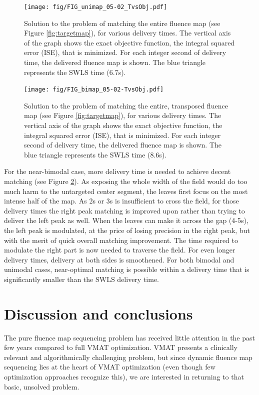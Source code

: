 \documentclass{iopart}
\begin{document}
\begin{figure}
  \centering
  \texttt{[image: fig/FIG\_unimap\_05-02\_TvsObj.pdf]}
  \caption{Solution to the problem of matching the entire fluence map (see Figure \ref{fig:targetmap}), for various delivery times. The vertical axis of the graph shows the exact objective function, the integral squared error (ISE), that is minimized. For each integer second of delivery time, the delivered fluence map is shown. The blue triangle represents the SWLS time (6.7s).}
  \label{fig:TvsObj_bestalpha_uni}
\end{figure}

\begin{figure}
  \centering
  \texttt{[image: fig/FIG\_bimap\_05-02-TvsObj.pdf]}
  \caption{Solution to the problem of matching the entire, transposed fluence map (see Figure \ref{fig:targetmap}), for various delivery times. The vertical axis of the graph shows the exact objective function, the integral squared error (ISE), that is minimized. For each integer second of delivery time, the delivered fluence map is shown. The blue triangle represents the SWLS time (8.6s).}
  \label{fig:TvsObj_bestalpha_bi}
\end{figure}

For the near-bimodal case, more delivery time is needed to achieve decent matching (see Figure \ref{fig:TvsObj_bestalpha_bi}). As exposing the whole width of the field would do too much harm to the untargeted center segment, the leaves first focus on the most intense half of the map. As 2s or 3s is insufficient to cross the field, for those delivery times the right peak matching is improved upon rather than trying to deliver the left peak as well. When the leaves can make it across the gap (4-5s), the left peak is modulated, at the price of losing precision in the right peak, but with the merit of quick overall matching improvement. The time required to modulate the right part is now needed to traverse the field. For even longer delivery times, delivery at both sides is smoothened. For both bimodal and unimodal cases, near-optimal matching is possible within a delivery time that is significantly smaller than the SWLS delivery time.



\section{Discussion and conclusions}

The pure fluence map sequencing problem has received little attention in the past few years compared to full VMAT optimization. VMAT presents a clinically relevant and algorithmically challenging problem, but since dynamic fluence map sequencing lies at the heart of VMAT optimization (even though few optimization approaches recognize this), we are interested in returning to that basic, unsolved problem.
\end{document}
